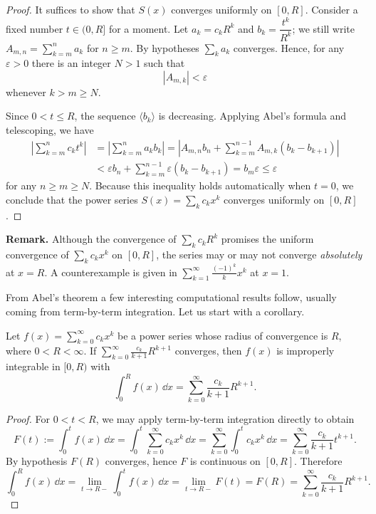 \documentclass[11pt]{article}
\begin{document}
\begin{proof}
  It suffices to show that $S(x)$ converges uniformly on $[0,R]$.
  Consider a fixed number $t \in (0, R]$ for a moment.
  Let $a_k = c_k R^k$ and $b_k = \dfrac{t^k}{R^k}$; we still write $A_{m,n} = \sum_{k=m}^n a_k$ for $n \geqslant m$.
  By hypotheses $\sum_k a_k$ converges.
  Hence, for any $\varepsilon > 0$ there is an integer $N > 1$ such that
  \[
    |A_{m,k}| < \varepsilon
  \]
  whenever $k > m \geqslant N$.

  Since $0 < t \leqslant R$, the sequence $\langle b_k \rangle$ is decreasing.
  Applying Abel's formula and telescoping, we have
  \begin{align*}
    \left| \sum_{k=m}^n c_k t^k \right| &= \left| \sum_{k=m}^n a_k b_k \right| 
    = \left| A_{m,n} b_n + \sum_{k=m}^{n-1} A_{m,k} (b_k - b_{k+1}) \right| \\
    &< \varepsilon b_n + \sum_{k=m}^{n-1} \varepsilon (b_k - b_{k+1}) = b_m \varepsilon \leqslant \varepsilon
  \end{align*}
  for any $n \geqslant m \geqslant N$.
  Because this inequality holds automatically when $t = 0$, we conclude that the power series $S(x) = \sum_k c_k x^k$ converges uniformly on $[0,R]$.
\end{proof}

\noindent\textbf{Remark.} Although the convergence of $\sum_k c_k R^k$ promises the uniform convergence of $\sum_k c_k x^k$ on $[0,R]$, the series may or may not converge \textit{absolutely} at $x=R$.
A counterexample is given in $\sum_{k=1}^\infty \frac{(-1)^k}{k} x^k$ at $x=1$.

From Abel's theorem a few interesting computational results follow, usually coming from term-by-term integration.
Let us start with a corollary.

\begin{cor}
  \label{cor:series-R-int}
  Let $\displaystyle f(x) = \sum_{k=0}^\infty c_k x^k$ be a power series whose radius of convergence is $R$, where $0 < R < \infty$.
  If $\displaystyle \sum_{k=0}^\infty \frac{c_k}{k+1} R^{k+1}$ converges, then $f(x)$ is improperly integrable in $[0,R)$ with
  \[
    \int_0^R f(x) \, \dd x = \sum_{k=0}^\infty \frac{c_k}{k+1} R^{k+1}.
  \]
\end{cor}

\begin{proof}
  For $0 < t < R$, we may apply term-by-term integration directly to obtain
  \[
    F(t) := \int_0^t f(x) \, \dd x = \int_0^t \sum_{k=0}^\infty c_k x^k \, \dd x = \sum_{k=0}^\infty \int_0^t c_k x^k \, \dd x = \sum_{k=0}^\infty \frac{c_k}{k+1} t^{k+1}.
  \]
  By hypothesis $F(R)$ converges, hence $F$ is continuous on $[0,R]$.
  Therefore
  \[
    \int_0^R f(x) \, \dd x = \lim_{t \to R-} \int_0^t f(x) \, \dd x = \lim_{t \to R-} F(t) = F(R) = \sum_{k=0}^\infty \frac{c_k}{k+1} R^{k+1}.
  \]
\end{proof}
\end{document}
